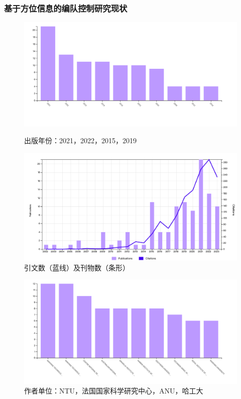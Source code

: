 \documentclass{beamer}
\theoremstyle{remark}
\begin{document}
\begin{frame}
	\frametitle{基于方位信息的编队控制研究现状}
	\begin{figure}[htbp]
		\centering
		\begin{minipage}[c]{0.5\textwidth} 
			\centering
			\includegraphics[width=1\linewidth]{Fig/bearing_year.jpg}
			\caption{出版年份：2021，2022，2015，2019}
		\end{minipage}%
		\begin{minipage}[c]{0.5\textwidth}
			\centering
			\includegraphics[width=1\linewidth]{Fig/bearing_all.jpg}
			\caption{引文数（蓝线）及刊物数（条形）}
		\end{minipage}
	\end{figure}	
	\begin{figure}[htbp]
		\centering
		\begin{minipage}[c]{0.5\textwidth} 
			\centering
			\includegraphics[width=1\linewidth]{Fig/bearing_affiliation.jpg}
			\caption{作者单位：NTU，法国国家科学研究中心，ANU，哈工大}
		\end{minipage}%
		\begin{minipage}[c]{0.5\textwidth}
			\centering
			
		\end{minipage}
	\end{figure}	
\end{frame}
\end{document}
